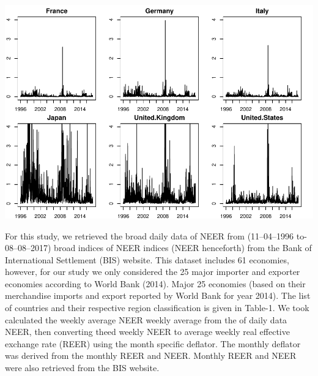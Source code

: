 \documentclass[]{elsarticle} %
\makeatletter
\def\maxwidth{\ifdim\Gin@nat@width>\linewidth\linewidth
\else\Gin@nat@width\fi}
\let\Oldincludegraphics\includegraphics
\renewcommand{\includegraphics}[1]{\Oldincludegraphics[width=\maxwidth]{#1}}
\makeatother
\begin{document}
\includegraphics{Main_files/figure-latex/unnamed-chunk-5-1.pdf}

For this study, we retrieved the broad daily data of NEER from
(11--04--1996 to- 08--08--2017) broad indices of NEER indices (NEER
henceforth) from the Bank of International Settlement (BIS) website.
This dataset includes 61 economies, however, for our study we only
considered the 25 major importer and exporter economies according to
World Bank (2014). Major 25 economies (based on their merchandise
imports and export reported by World Bank for year 2014). The list of
countries and their respective region classification is given in
Table-1. We took calculated the weekly average NEER weekly average from
the of daily data NEER, then converting theed weekly NEER to average
weekly real effective exchange rate (REER) using the month specific
deflator. The monthly deflator was derived from the monthly REER and
NEER. Monthly REER and NEER were also retrieved from the BIS website.
\end{document}
